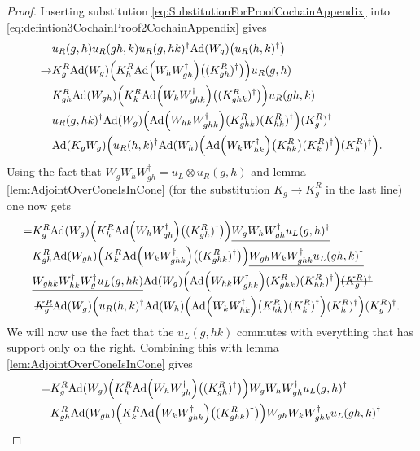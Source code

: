 \documentclass[11pt,a4paper,twoside]{article}
\numberwithin{equation}{section}
\begin{document}
	\begin{proof}
		Inserting substitution \eqref{eq:SubstitutionForProofCochainAppendix} into \eqref{eq:defintion3CochainProof2CochainAppendix} gives
		\begin{align}
			&u_R(g,h)u_R(gh,k)u_R(g,hk)^\dagger\Ad{W_g}\left(u_R(h,k)^\dagger\right)\\
			\rightarrow&K_g^R\Ad{W_g}\left(K_h^R\Ad{W_hW_{gh}^\dagger}\left((K_{gh}^R)^\dagger\right)\right)u_
			R(g,h)\\
			\nonumber
			&K_{gh}^R\Ad{W_{gh}}\left(K_k^R\Ad{W_kW_{ghk}^\dagger}\left((K_{ghk}^R)^\dagger\right)\right)u_
			R(gh,k)\\
			\nonumber
			&u_R(g,hk)^\dagger \Ad{W_g}\left( \Ad{W_{hk}W_{ghk}^\dagger}(K^R_{ghk})(K^R_{hk})^{\dagger} \right)(K^R_g)^\dagger\\
			\nonumber
			&\Ad{K_gW_g}\left(u_R(h,k)^\dagger \Ad{W_h}\left(\Ad{W_kW_{hk}^\dagger}\left(K_{hk}^R\right)(K^R_k)^\dagger\right)(K^R_h)^\dagger\right).
		\end{align}
		Using the fact that $W_gW_hW_{gh}^\dagger=u_L\otimes u_R(g,h)$ and lemma \ref{lem:AdjointOverConeIsInCone} (for the substitution $K_g\rightarrow K_g^R$ in the last line) one now gets
		\begin{align}
			=&K_g^R\Ad{W_g}\left(K_h^R\Ad{W_hW_{gh}^\dagger}\left((K_{gh}^R)^\dagger\right)\right)\underline{W_gW_hW_{gh}^\dagger u_L(g,h)^\dagger}\\
			\nonumber
			&K_{gh}^R\Ad{W_{gh}}\left(K_k^R\Ad{W_kW_{ghk}^\dagger}\left((K_{ghk}^R)^\dagger\right)\right) \underline{W_{gh}W_kW_{ghk}^\dagger u_L(gh,k)^\dagger}\\
			\nonumber
			&\underline{W_{ghk}W_{hk}^\dagger W_{g}^\dagger u_L(g,hk)} \Ad{W_g}\left( \Ad{W_{hk}W_{ghk}^\dagger}(K^R_{ghk})(K^R_{hk})^{\dagger} \right)\stkout{(K^R_g)^\dagger}\\
			\nonumber
			&\:\stkout{K^R_g}\Ad{W_g}\left(u_R(h,k)^\dagger \Ad{W_h}\left(\Ad{W_kW_{hk}^\dagger}\left(K_{hk}^R\right)(K^R_k)^\dagger\right)(K^R_h)^\dagger\right)(K^R_g)^\dagger.
		\end{align}
		We will now use the fact that the $u_L(g,hk)$ commutes with everything that has support only on the right. Combining this with lemma \ref{lem:AdjointOverConeIsInCone} gives
		\begin{align}
			=&K_g^R\Ad{W_g}\left(K_h^R\Ad{W_hW_{gh}^\dagger}\left((K_{gh}^R)^\dagger\right)\right)W_gW_hW_{gh}^\dagger u_L(g,h)^\dagger\\
			\nonumber
			&K_{gh}^R\Ad{W_{gh}}\left(K_k^R\Ad{W_kW_{ghk}^\dagger}\left((K_{ghk}^R)^\dagger\right)\right) W_{gh}W_kW_{ghk}^\dagger u_L(gh,k)^\dagger\\

\end{align}
\end{proof}
\end{document}
